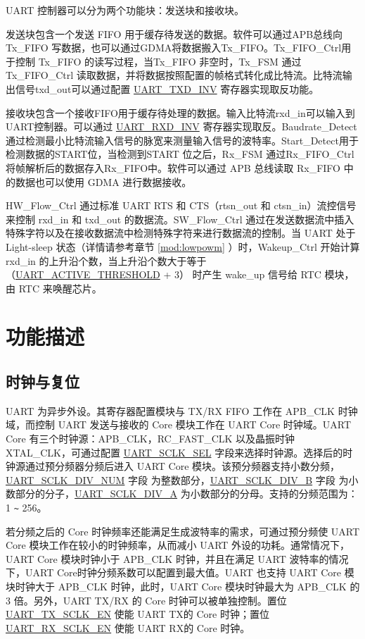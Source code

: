 \documentclass[main\_\_CN.tex]{subfiles}
\begin{document}
UART 控制器可以分为两个功能块：发送块和接收块。

发送块包含一个发送 FIFO 用于缓存待发送的数据。软件可以通过APB总线向 Tx\_FIFO 写数据，也可以通过GDMA将数据搬入Tx\_FIFO。Tx\_FIFO\_Ctrl用于控制 Tx\_FIFO 的读写过程，当Tx\_FIFO 非空时，Tx\_FSM 通过 Tx\_FIFO\_Ctrl 读取数据，并将数据按照配置的帧格式转化成比特流。比特流输出信号txd\_out可以通过配置 \hyperref[fielddesc:UARTTXDINV]{UART\_TXD\_INV} 寄存器实现取反功能。

接收块包含一个接收FIFO用于缓存待处理的数据。输入比特流rxd\_in可以输入到UART控制器。可以通过
\hyperref[fielddesc:UARTRXDINV]{UART\_RXD\_INV} 寄存器实现取反。Baudrate\_Detect通过检测最小比特流输入信号的脉宽来测量输入信号的波特率。Start\_Detect用于检测数据的START位，当检测到START 位之后，Rx\_FSM 通过Rx\_FIFO\_Ctrl将帧解析后的数据存入Rx\_FIFO中。软件可以通过 APB 总线读取 Rx\_FIFO 中的数据也可以使用 GDMA 进行数据接收。

HW\_Flow\_Ctrl 通过标准 UART RTS 和 CTS（rtsn\_out 和 ctsn\_in）流控信号来控制 rxd\_in 和 txd\_out 的数据流。SW\_Flow\_Ctrl 通过在发送数据流中插入特殊字符以及在接收数据流中检测特殊字符来进行数据流的控制。当 UART 处于 Light-sleep 状态（详情请参考章节 \ref{mod:lowpowm} \textit{}）时，Wakeup\_Ctrl 开始计算 rxd\_in 的上升沿个数，当上升沿个数大于等于 （\hyperref[fielddesc:UARTACTIVETHRESHOLD]{UART\_ACTIVE\_THRESHOLD} + 3） 时产生 wake\_up 信号给 RTC 模块，由 RTC 来唤醒芯片。

\section{功能描述}

\subsection{时钟与复位}
UART 为异步外设。其寄存器配置模块与 TX/RX FIFO 工作在 APB\_CLK 时钟域，而控制 UART 发送与接收的 Core 模块工作在 UART Core 时钟域。UART Core 有三个时钟源：APB\_CLK，RC\_FAST\_CLK 以及晶振时钟 XTAL\_CLK，可通过配置 \hyperref[fielddesc:UARTSCLKSEL]{UART\_SCLK\_SEL} 字段来选择时钟源。选择后的时钟源通过预分频器分频后进入 UART Core 模块。该预分频器支持小数分频，\hyperref[fielddesc:UARTSCLKDIVNUM]{UART\_SCLK\_DIV\_NUM} 字段 为整数部分，\hyperref[fielddesc:UARTSCLKDIVB]{UART\_SCLK\_DIV\_B} 字段 为小数部分的分子，\hyperref[fielddesc:UARTSCLKDIVA]{UART\_SCLK\_DIV\_A}  为小数部分的分母。支持的分频范围为：1 \verb+~+ 256。

若分频之后的 Core 时钟频率还能满足生成波特率的需求，可通过预分频使 UART Core 模块工作在较小的时钟频率，从而减小 UART 外设的功耗。通常情况下，UART Core 模块时钟小于 APB\_CLK 时钟，并且在满足 UART 波特率的情况下，UART Core时钟分频系数可以配置到最大值。UART 也支持 UART Core 模块时钟大于 APB\_CLK 时钟，此时，UART Core 模块时钟最大为 APB\_CLK 的 3 倍。另外，UART TX/RX 的 Core 时钟可以被单独控制。置位 \hyperref[fielddesc:UARTTXSCLKEN]{UART\_TX\_SCLK\_EN} 使能 UART TX的 Core 时钟；置位 \hyperref[fielddesc:UARTRXSCLKEN]{UART\_RX\_SCLK\_EN} 使能 UART RX的 Core 时钟。
\end{document}
